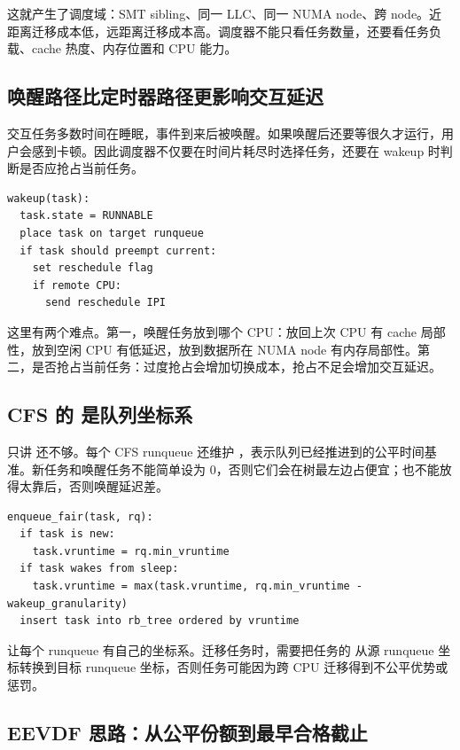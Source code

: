 这就产生了调度域：SMT sibling、同一 LLC、同一 NUMA node、跨 node。近距离迁移成本低，远距离迁移成本高。调度器不能只看任务数量，还要看任务负载、cache 热度、内存位置和 CPU 能力。

\subsection{唤醒路径比定时器路径更影响交互延迟}

交互任务多数时间在睡眠，事件到来后被唤醒。如果唤醒后还要等很久才运行，用户会感到卡顿。因此调度器不仅要在时间片耗尽时选择任务，还要在 wakeup 时判断是否应抢占当前任务。

\begin{lstlisting}
wakeup(task):
  task.state = RUNNABLE
  place task on target runqueue
  if task should preempt current:
    set reschedule flag
    if remote CPU:
      send reschedule IPI
\end{lstlisting}

这里有两个难点。第一，唤醒任务放到哪个 CPU：放回上次 CPU 有 cache 局部性，放到空闲 CPU 有低延迟，放到数据所在 NUMA node 有内存局部性。第二，是否抢占当前任务：过度抢占会增加切换成本，抢占不足会增加交互延迟。

\subsection{CFS 的  是队列坐标系}

只讲  还不够。每个 CFS runqueue 还维护 ，表示队列已经推进到的公平时间基准。新任务和唤醒任务不能简单设为 0，否则它们会在树最左边占便宜；也不能放得太靠后，否则唤醒延迟差。

\begin{lstlisting}
enqueue_fair(task, rq):
  if task is new:
    task.vruntime = rq.min_vruntime
  if task wakes from sleep:
    task.vruntime = max(task.vruntime, rq.min_vruntime - wakeup_granularity)
  insert task into rb_tree ordered by vruntime
\end{lstlisting}

 让每个 runqueue 有自己的坐标系。迁移任务时，需要把任务的  从源 runqueue 坐标转换到目标 runqueue 坐标，否则任务可能因为跨 CPU 迁移得到不公平优势或惩罚。

\subsection{EEVDF 思路：从公平份额到最早合格截止}

